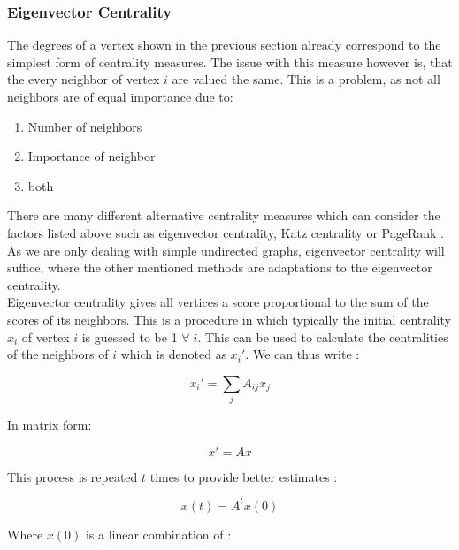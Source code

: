 	\subsubsection{Eigenvector Centrality}

	The degrees of a vertex shown in the previous section already correspond to
	the simplest form of centrality measures. The issue with this measure
	however is, that the every neighbor of vertex $i$ are valued the same. This
	is a problem, as not all neighbors are of equal importance due to:

	\begin{enumerate}
		\item Number of neighbors
		\item Importance of neighbor
		\item both
	\end{enumerate}

	\noindent There are many different alternative centrality measures which
	can consider the factors listed above such as eigenvector centrality, Katz
	centrality or PageRank
	\citep{katz1953new,page1999pagerank,landau1895relativen,Newman2010}. As we 
	are only dealing with simple undirected graphs, eigenvector centrality will 
	suffice, where the other mentioned methods are adaptations to the 
	eigenvector centrality. \\

	\noindent Eigenvector centrality gives all vertices a score proportional to
	the sum of the scores of its neighbors. This is a procedure in which
	typically the initial centrality $x_i$ of vertex $i$ is guessed to be 1
	$\forall \; i$. This can be used to calculate the centralities of the
	neighbors of $i$ which is denoted as $x_{i}'$. We can thus write
	\citep[p. 169]{Newman2010}:

	\begin{equation}
		x_i' = \sum_{j}A_{ij}x_j
	\end{equation}

	\noindent In matrix form:

	\begin{equation}
		x' = Ax
	\end{equation}

	\noindent This process is repeated $t$ times to provide better estimates
	\citep[p. 170]{Newman2010}:

	\begin{equation}
		x(t) =  A^tx(0)
	\end{equation}

	\noindent Where $x(0)$ is a linear combination of \citep[p. 170]{Newman2010}:

